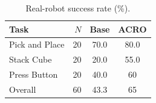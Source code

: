 \begin{table}
\centering
\normalsize
\setlength{\tabcolsep}{5pt}
\caption{Real-robot success rate (\%).}
\label{tab:real-robot}
\vspace{2pt}
\begin{tabular}{@{}lrcc@{}}
\toprule
Task & $N$ & Base & ACRO \\
\midrule
Pick and Place & 20 & 70.0 & 80.0 \\
Stack Cube     & 20 & 20.0 & 55.0 \\
Press Button   & 20 & 40.0 & 60 \\
\midrule
Overall        & 60 & 43.3 & 65 \\
\bottomrule
\end{tabular}
\end{table}
